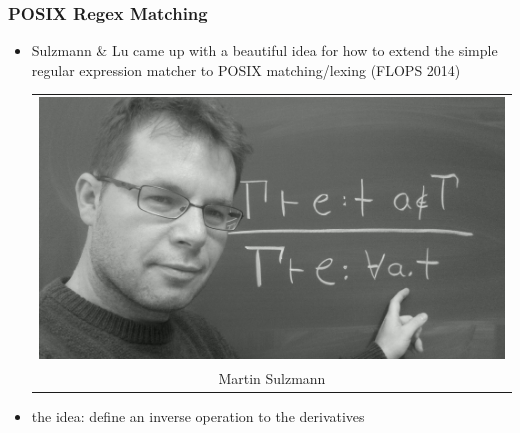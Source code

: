 \documentclass[dvipsnames,14pt,t]{beamer}
\begin{document}
\begin{frame}[c]
\frametitle{POSIX Regex Matching}

\begin{itemize}

\item Sulzmann \& Lu came up with a beautiful
idea for how to extend the simple regular expression 
matcher to POSIX matching/lexing (FLOPS 2014)\bigskip\bigskip

\begin{tabular}{@{\hspace{4cm}}c@{}}
  \includegraphics[scale=0.20]{pics/sulzmann.jpg}\\[-2mm]
  \hspace{0cm}\footnotesize Martin Sulzmann
\end{tabular}\bigskip\bigskip

\item the idea: define an inverse operation to the derivatives
\end{itemize}



\end{frame}
\end{document}
